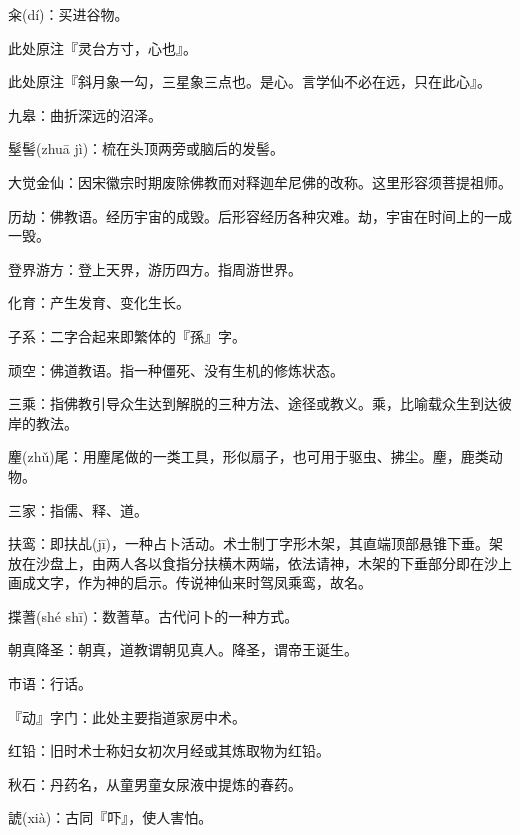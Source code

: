\startbuffer[62]
籴(dí)：买进谷物。
\stopbuffer


\startbuffer[63]
此处原注『灵台方寸，心也』。
\stopbuffer


\startbuffer[64]
此处原注『斜月象一勾，三星象三点也。是心。言学仙不必在远，只在此心』。
\stopbuffer


\startbuffer[65]
九皋：曲折深远的沼泽。
\stopbuffer


\startbuffer[66]
髽髻(zhuā jì)：梳在头顶两旁或脑后的发髻。
\stopbuffer


\startbuffer[67]
大觉金仙：因宋徽宗时期废除佛教而对释迦牟尼佛的改称。这里形容须菩提祖师。
\stopbuffer


\startbuffer[68]
历劫：佛教语。经历宇宙的成毁。后形容经历各种灾难。劫，宇宙在时间上的一成一毁。
\stopbuffer


\startbuffer[69]
登界游方：登上天界，游历四方。指周游世界。
\stopbuffer


\startbuffer[70]
化育：产生发育、变化生长。
\stopbuffer


\startbuffer[71]
子系：二字合起来即繁体的『孫』字。
\stopbuffer


\startbuffer[72]
顽空：佛道教语。指一种僵死、没有生机的修炼状态。
\stopbuffer


\startbuffer[73]
三乘：指佛教引导众生达到解脱的三种方法、途径或教义。乘，比喻载众生到达彼岸的教法。
\stopbuffer


\startbuffer[74]
麈(zhǔ)尾：用麈尾做的一类工具，形似扇子，也可用于驱虫、拂尘。麈，鹿类动物。
\stopbuffer


\startbuffer[75]
三家：指儒、释、道。
\stopbuffer


\startbuffer[76]
扶鸾：即扶乩(jī)，一种占卜活动。术士制丁字形木架，其直端顶部悬锥下垂。架放在沙盘上，由两人各以食指分扶横木两端，依法请神，木架的下垂部分即在沙上画成文字，作为神的启示。传说神仙来时驾凤乘鸾，故名。
\stopbuffer


\startbuffer[77]
揲蓍(shé shī)：数蓍草。古代问卜的一种方式。
\stopbuffer


\startbuffer[78]
朝真降圣：朝真，道教谓朝见真人。降圣，谓帝王诞生。
\stopbuffer


\startbuffer[79]
市语：行话。
\stopbuffer


\startbuffer[80]
『动』字门：此处主要指道家房中术。
\stopbuffer


\startbuffer[81]
红铅：旧时术士称妇女初次月经或其炼取物为红铅。
\stopbuffer


\startbuffer[82]
秋石：丹药名，从童男童女尿液中提炼的春药。
\stopbuffer


\startbuffer[83]
諕(xià)：古同『吓』，使人害怕。
\stopbuffer


